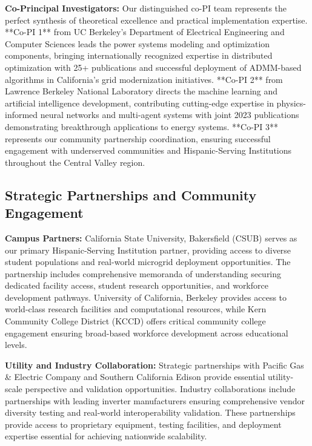 \documentclass[12pt]{article}
\begin{document}
\textbf{Co-Principal Investigators:} Our distinguished co-PI team represents the perfect synthesis of theoretical excellence and practical implementation expertise. **Co-PI 1** from UC Berkeley's Department of Electrical Engineering and Computer Sciences leads the power systems modeling and optimization components, bringing internationally recognized expertise in distributed optimization with 25+ publications and successful deployment of ADMM-based algorithms in California's grid modernization initiatives. **Co-PI 2** from Lawrence Berkeley National Laboratory directs the machine learning and artificial intelligence development, contributing cutting-edge expertise in physics-informed neural networks and multi-agent systems with joint 2023 publications demonstrating breakthrough applications to energy systems. **Co-PI 3** represents our community partnership coordination, ensuring successful engagement with underserved communities and Hispanic-Serving Institutions throughout the Central Valley region.

\subsection{Strategic Partnerships and Community Engagement}

\textbf{Campus Partners:} California State University, Bakersfield (CSUB) serves as our primary Hispanic-Serving Institution partner, providing access to diverse student populations and real-world microgrid deployment opportunities. The partnership includes comprehensive memoranda of understanding securing dedicated facility access, student research opportunities, and workforce development pathways. University of California, Berkeley provides access to world-class research facilities and computational resources, while Kern Community College District (KCCD) offers critical community college engagement ensuring broad-based workforce development across educational levels.

\textbf{Utility and Industry Collaboration:} Strategic partnerships with Pacific Gas \& Electric Company and Southern California Edison provide essential utility-scale perspective and validation opportunities. Industry collaborations include partnerships with leading inverter manufacturers ensuring comprehensive vendor diversity testing and real-world interoperability validation. These partnerships provide access to proprietary equipment, testing facilities, and deployment expertise essential for achieving nationwide scalability.
\end{document}
